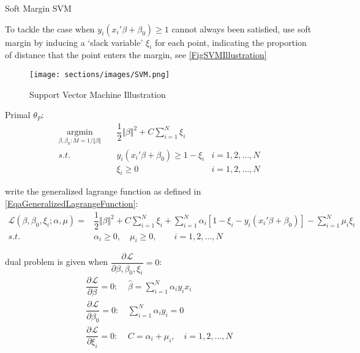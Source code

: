 \begin{point}
    Soft Margin SVM
\end{point}

    To tackle the case when $ y_i(x_i'\beta +\beta _0)\geq 1 $ cannot always been satisfied, use soft margin by inducing a `slack variable' $ \xi _i $ for each point, indicating the proportion of distance that the point enters the margin, see \autoref{FigSVMIllustration}

\begin{figure}[H]
    \centering
    \texttt{[image: sections/images/SVM.png]}
    \caption{Support Vector Machine Illustration}
    \label{FigSVMIllustration}
\end{figure}

    Primal $ \theta _P $:
    \begin{equation*}
        \begin{aligned}
        \mathop{\arg\min}\limits_{\beta ,\beta _0:M=1/\Vert \beta  \Vert }\quad &\dfrac{1}{2}\Vert \beta  \Vert^2+C\sum_{i=1}^N\xi _i \\
        s.t.\quad & y_i(x_i'\beta +\beta _0)\geq 1-\xi _i&i=1,2,\ldots,N\\
        &\xi _i\geq 0&i=1,2,\ldots,N
        \end{aligned}
    \end{equation*}

    write the generalized lagrange function as defined in \autoref{EqaGeneralizedLagrangeFunction}:
\begin{align}
    \mathcal{L}(\beta ,\beta _0,\xi _i;\alpha ,\mu )=&\dfrac{1}{2}\Vert \beta  \Vert ^2+C\sum_{i=1}^N\xi _i+\sum_{i=1}^N\alpha _i\left[1-\xi _i-y_i(x_i'\beta +\beta _0)\right]-\sum_{i=1}^N\mu _i\xi _i \\
    s.t.\quad & \alpha _i\geq 0,\quad \mu _i\geq 0,\qquad i=1,2,\ldots,N
\end{align}
        
    dual problem is given when $ \dfrac{\partial^{} \mathcal{L}}{\partial \beta ,\beta _0,\xi _i^{}}=0 $:
\begin{align}
    \dfrac{\partial^{} \mathcal{L}}{\partial \beta ^{}}=0:\,&\hat{\beta }=\sum_{i=1}^N\alpha _iy_ix_i\\
    \dfrac{\partial^{} \mathcal{L}}{\partial \beta _0^{}}=0:\,&\sum_{i=1}^N\alpha _iy_i=0\\
    \dfrac{\partial^{} \mathcal{L}}{\partial \xi _i^{}}=0:\,&C=\alpha _i+\mu _i,\quad i=1,2,\ldots,N
\end{align}

